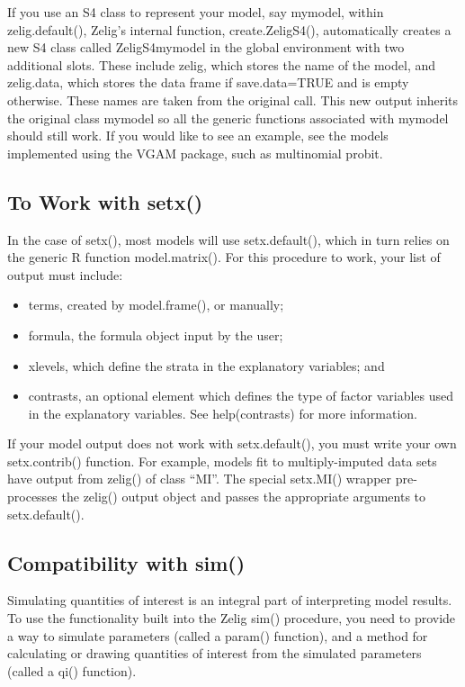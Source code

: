 \documentclass[letterpaper,10pt,english]{sphinxmanual}
\begin{document}
If you use an S4 class to represent your model, say mymodel, within
zelig.default(), Zelig’s internal function, create.ZeligS4(),
automatically creates a new S4 class called ZeligS4mymodel in the global
environment with two additional slots. These include zelig, which stores
the name of the model, and zelig.data, which stores the data frame if
save.data=TRUE and is empty otherwise. These names are taken from the
original call. This new output inherits the original class mymodel so
all the generic functions associated with mymodel should still work. If
you would like to see an example, see the models implemented using the
VGAM package, such as multinomial probit.


\subsection{To Work with setx()}
\label{9_adding_models_and_methods:to-work-with-setx}
In the case of setx(), most models will use setx.default(), which in
turn relies on the generic R function model.matrix(). For this procedure
to work, your list of output must include:
\begin{itemize}
\item {} 
terms, created by model.frame(), or manually;

\item {} 
formula, the formula object input by the user;

\item {} 
xlevels, which define the strata in the explanatory variables; and

\item {} 
contrasts, an optional element which defines the type of factor
variables used in the explanatory variables. See help(contrasts) for
more information.

\end{itemize}

If your model output does not work with setx.default(), you must write
your own setx.contrib() function. For example, models fit to
multiply-imputed data sets have output from zelig() of class “MI”. The
special setx.MI() wrapper pre-processes the zelig() output object and
passes the appropriate arguments to setx.default().


\subsection{Compatibility with sim()}
\label{9_adding_models_and_methods:compatibility-with-sim}
Simulating quantities of interest is an integral part of interpreting
model results. To use the functionality built into the Zelig sim()
procedure, you need to provide a way to simulate parameters (called a
param() function), and a method for calculating or drawing quantities of
interest from the simulated parameters (called a qi() function).
\end{document}
